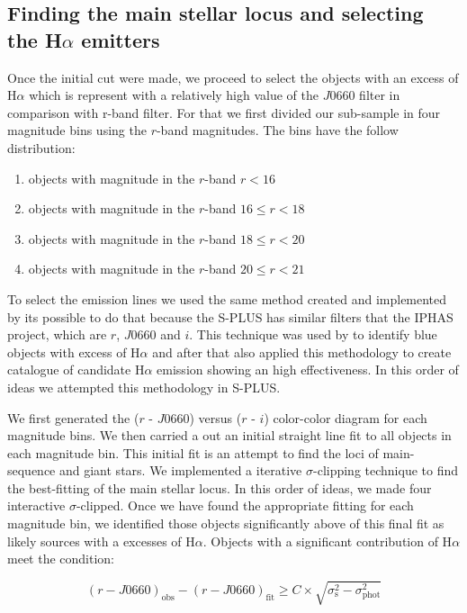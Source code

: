 \documentclass[fleqn,usenatbib]{mnras}
\begin{document}
\subsection{Finding the main stellar locus and selecting the H{$\alpha$ emitters}}
\label{sec:}

Once the initial cut were made, we proceed to select the objects with
an excess of H{$\alpha$} which is represent with a relatively high value of
the  $J$0660 filter in comparison with r-band filter. For that we
first divided our sub-sample in four magnitude bins using the $r$-band
magnitudes. The bins have the follow distribution:

\begin{enumerate}
\item  objects with magnitude in the $r$-band $r < 16$
\item  objects with magnitude in the $r$-band $16 \leq r < 18$
\item  objects with magnitude in the $r$-band $18 \leq r < 20$
\item  objects with magnitude in the $r$-band $20 \leq r < 21$
  
\end{enumerate}

To select the emission lines we used the same method created and
implemented by \citet{Witham:2008} its possible to do that because
the S-PLUS has similar filters that the IPHAS project, which are
$r$, $J$0660 and $i$. This technique was used by \citet{Scaringi:2013}
to identify blue objects with excess of H{$\alpha$} and after that
\citet{Wevers:2017} also applied this methodology to create catalogue
of candidate H{$\alpha$} emission showing an high effectiveness. In this
order of ideas we attempted this methodology in S-PLUS.

We first generated the ($r$ - $J$0660) versus ($r$ - $i$) color-color
diagram for each magnitude bins. We then carried a out an initial straight
line fit to all objects in each magnitude bin. This initial fit is an
attempt to find the loci of main-sequence and giant stars. We implemented
a iterative $\sigma$-clipping technique to find the best-fitting of the main
stellar locus. In this order of ideas, we made four interactive $\sigma$-clipped.
Once we have found the appropriate fitting for each magnitude bin, we identified
those objects significantly above of this final fit as likely sources with
a excesses of H{$\alpha$}. Objects with a significant contribution of
H{$\alpha$} meet the condition:

\begin{equation}
  (r - J0660)_{\mathrm{obs}} - (r - J0660)_{\mathrm{fit}} \geq C \times \sqrt{\sigma^2_{\mathrm{s}} - \sigma^2_{\mathrm{phot}}}
  \label{eq:criterion}
\end{equation}
 
\end{document}
